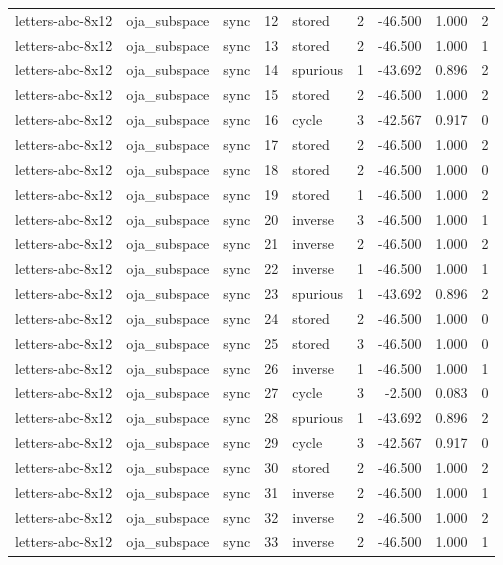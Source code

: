 \begin{tabular}{lllrlrrrr}
letters-abc-8x12 & oja\_subspace & sync & 12 & stored & 2 & -46.500 & 1.000 & 2 \\
letters-abc-8x12 & oja\_subspace & sync & 13 & stored & 2 & -46.500 & 1.000 & 1 \\
letters-abc-8x12 & oja\_subspace & sync & 14 & spurious & 1 & -43.692 & 0.896 & 2 \\
letters-abc-8x12 & oja\_subspace & sync & 15 & stored & 2 & -46.500 & 1.000 & 2 \\
letters-abc-8x12 & oja\_subspace & sync & 16 & cycle & 3 & -42.567 & 0.917 & 0 \\
letters-abc-8x12 & oja\_subspace & sync & 17 & stored & 2 & -46.500 & 1.000 & 2 \\
letters-abc-8x12 & oja\_subspace & sync & 18 & stored & 2 & -46.500 & 1.000 & 0 \\
letters-abc-8x12 & oja\_subspace & sync & 19 & stored & 1 & -46.500 & 1.000 & 2 \\
letters-abc-8x12 & oja\_subspace & sync & 20 & inverse & 3 & -46.500 & 1.000 & 1 \\
letters-abc-8x12 & oja\_subspace & sync & 21 & inverse & 2 & -46.500 & 1.000 & 2 \\
letters-abc-8x12 & oja\_subspace & sync & 22 & inverse & 1 & -46.500 & 1.000 & 1 \\
letters-abc-8x12 & oja\_subspace & sync & 23 & spurious & 1 & -43.692 & 0.896 & 2 \\
letters-abc-8x12 & oja\_subspace & sync & 24 & stored & 2 & -46.500 & 1.000 & 0 \\
letters-abc-8x12 & oja\_subspace & sync & 25 & stored & 3 & -46.500 & 1.000 & 0 \\
letters-abc-8x12 & oja\_subspace & sync & 26 & inverse & 1 & -46.500 & 1.000 & 1 \\
letters-abc-8x12 & oja\_subspace & sync & 27 & cycle & 3 & -2.500 & 0.083 & 0 \\
letters-abc-8x12 & oja\_subspace & sync & 28 & spurious & 1 & -43.692 & 0.896 & 2 \\
letters-abc-8x12 & oja\_subspace & sync & 29 & cycle & 3 & -42.567 & 0.917 & 0 \\
letters-abc-8x12 & oja\_subspace & sync & 30 & stored & 2 & -46.500 & 1.000 & 2 \\
letters-abc-8x12 & oja\_subspace & sync & 31 & inverse & 2 & -46.500 & 1.000 & 1 \\
letters-abc-8x12 & oja\_subspace & sync & 32 & inverse & 2 & -46.500 & 1.000 & 2 \\
letters-abc-8x12 & oja\_subspace & sync & 33 & inverse & 2 & -46.500 & 1.000 & 1 \\

\end{tabular}
